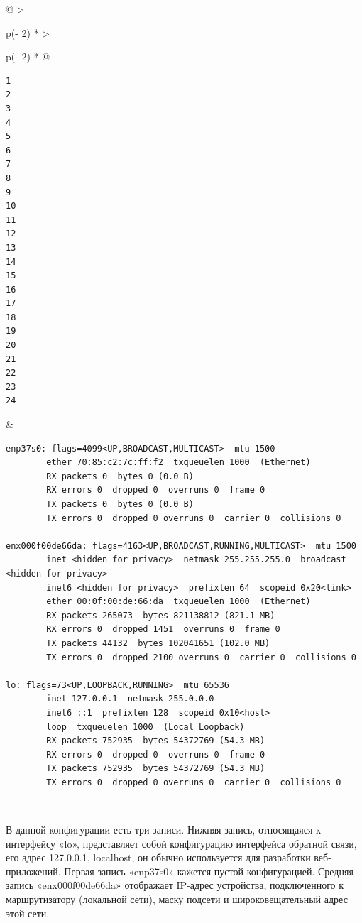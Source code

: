 \documentclass{report}
\begin{document}
\begin{longtable}[]{@{}
  >{\raggedright\arraybackslash}p{(\columnwidth - 2\tabcolsep) * }
  >{\raggedright\arraybackslash}p{(\columnwidth - 2\tabcolsep) * }@{}}
\toprule
\endhead
\begin{minipage}[t]{\linewidth}\raggedright
\begin{verbatim}
1
2
3
4
5
6
7
8
9
10
11
12
13
14
15
16
17
18
19
20
21
22
23
24
\end{verbatim}
\end{minipage} & \begin{minipage}[t]{\linewidth}\raggedright
\begin{verbatim}
enp37s0: flags=4099<UP,BROADCAST,MULTICAST>  mtu 1500
        ether 70:85:c2:7c:ff:f2  txqueuelen 1000  (Ethernet)
        RX packets 0  bytes 0 (0.0 B)
        RX errors 0  dropped 0  overruns 0  frame 0
        TX packets 0  bytes 0 (0.0 B)
        TX errors 0  dropped 0 overruns 0  carrier 0  collisions 0

enx000f00de66da: flags=4163<UP,BROADCAST,RUNNING,MULTICAST>  mtu 1500
        inet <hidden for privacy>  netmask 255.255.255.0  broadcast <hidden for privacy>
        inet6 <hidden for privacy>  prefixlen 64  scopeid 0x20<link>
        ether 00:0f:00:de:66:da  txqueuelen 1000  (Ethernet)
        RX packets 265073  bytes 821138812 (821.1 MB)
        RX errors 0  dropped 1451  overruns 0  frame 0
        TX packets 44132  bytes 102041651 (102.0 MB)
        TX errors 0  dropped 2100 overruns 0  carrier 0  collisions 0

lo: flags=73<UP,LOOPBACK,RUNNING>  mtu 65536
        inet 127.0.0.1  netmask 255.0.0.0
        inet6 ::1  prefixlen 128  scopeid 0x10<host>
        loop  txqueuelen 1000  (Local Loopback)
        RX packets 752935  bytes 54372769 (54.3 MB)
        RX errors 0  dropped 0  overruns 0  frame 0
        TX packets 752935  bytes 54372769 (54.3 MB)
        TX errors 0  dropped 0 overruns 0  carrier 0  collisions 0
\end{verbatim}
\end{minipage} \\ \addlinespace
\bottomrule
\end{longtable}

В данной конфигурации есть три записи. Нижняя запись, относящаяся к
интерфейсу «lo», представляет собой конфигурацию интерфейса обратной
связи, его адрес 127.0.0.1, localhost, он обычно используется для
разработки веб-приложений. Первая запись «enp37s0» кажется пустой
конфигурацией. Средняя запись «enx000f00de66da» отображает IP-адрес
устройства, подключенного к маршрутизатору (локальной сети), маску
подсети и широковещательный адрес этой сети.
\end{document}
